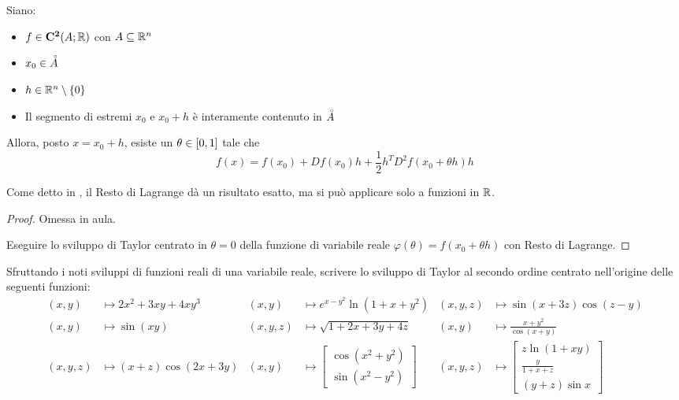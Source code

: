 \begin{proposition}
	Siano:
	\begin{itemize}[noitemsep]
		\item $f \in \mathbf{C^{2}}(A;\mathbb{R})$ con $A \subseteq \mathbb{R}^n$
		\item $x_0 \in \accentset{\circ}{A}$
		\item $h \in \mathbb{R}^n \setminus \left\{0\right\}$
		\item Il segmento di estremi $x_0$ e $x_0 + h$ è interamente contenuto in $\accentset{\circ}{A}$
	\end{itemize}
	Allora, posto $x = x_0 + h$, esiste un $\theta \in \left[0,1\right]$ tale che
	\[f(x) = f(x_0) + Df(x_0)h + \frac{1}{2} h^T D^2 f(x_0 + \theta h) h\]
	\begin{note}
		Come detto in , il Resto di Lagrange dà un risultato esatto, ma si può applicare solo a funzioni in $\mathbb{R}$.
	\end{note}
	\begin{proof}
		Omessa in aula.

		\cbstart
		Eseguire lo sviluppo di Taylor centrato in $\theta = 0$ della funzione di variabile reale $\varphi(\theta) = f(x_0 + \theta h)$ con Resto di Lagrange.
		\cbend
	\end{proof}
\end{proposition}

\begin{exercise}
	Sfruttando i noti sviluppi di funzioni reali di una variabile reale, scrivere lo sviluppo di Taylor al secondo ordine centrato nell'origine delle seguenti funzioni:
	\begin{align*}
		(x,y) &\mapsto 2x^2 + 3xy + 4xy^3 &
		(x,y) &\mapsto e^{x-y^2} \ln(1+x+y^2) &
		(x,y,z) &\mapsto \sin(x + 3z) \cos(z - y) \\
		(x,y) &\mapsto \sin(xy) &
		(x,y,z) &\mapsto \sqrt{1+2x+3y+4z} &
		(x,y) &\mapsto \frac{x+y^2}{\cos (x+y)} \\
		(x,y,z) &\mapsto (x+z) \cos (2x+3y) &
		(x,y) &\mapsto \begin{bmatrix}
			\cos(x^2 + y^2)\\
			\sin(x^2 - y^2)
		\end{bmatrix} &
		(x,y,z) &\mapsto \begin{bmatrix}
			z \ln (1 + xy)\\
			\frac{y}{1+x+z}\\
			(y + z) \sin x
		\end{bmatrix}
	\end{align*}
\end{exercise}

